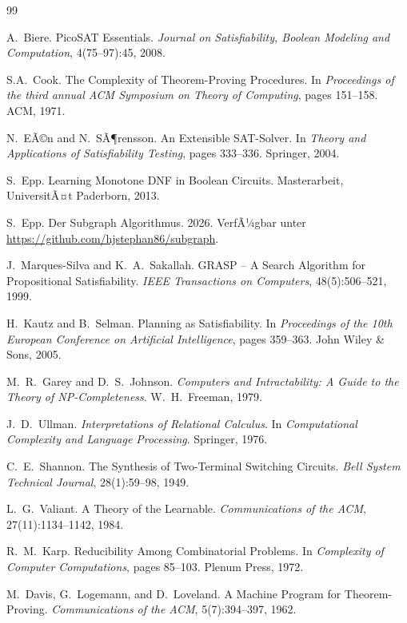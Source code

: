﻿\documentclass[a4paper,12pt]{article}
\theoremstyle{definition}
\begin{document}
\begin{thebibliography}{99}

A.\ Biere. PicoSAT Essentials. \textit{Journal on Satisfiability, Boolean Modeling and Computation}, 4(75--97):45, 2008.

S.A.\ Cook. The Complexity of Theorem-Proving Procedures. In \textit{Proceedings of the third annual ACM Symposium on Theory of Computing}, pages 151--158. ACM, 1971.

N.\ EÃ©n and N.\ SÃ¶rensson. An Extensible SAT-Solver. In \textit{Theory and Applications of Satisfiability Testing}, pages 333--336. Springer, 2004.

S.\ Epp. Learning Monotone DNF in Boolean Circuits. Masterarbeit, UniversitÃ¤t Paderborn, 2013.

S.\ Epp. Der Subgraph Algorithmus. 2026. VerfÃ¼gbar unter \url{https://github.com/hjstephan86/subgraph}.

J.\ Marques-Silva and K.\ A.\ Sakallah. GRASP -- A Search Algorithm for Propositional Satisfiability. \textit{IEEE Transactions on Computers}, 48(5):506--521, 1999.

H.\ Kautz and B.\ Selman. Planning as Satisfiability. In \textit{Proceedings of the 10th European Conference on Artificial Intelligence}, pages 359--363. John Wiley \& Sons, 2005.

M.\ R.\ Garey and D.\ S.\ Johnson. \textit{Computers and Intractability: A Guide to the Theory of NP-Completeness}. W.\ H.\ Freeman, 1979.

J.\ D.\ Ullman. \textit{Interpretations of Relational Calculus}. In \textit{Computational Complexity and Language Processing}. Springer, 1976.

C.\ E.\ Shannon. The Synthesis of Two-Terminal Switching Circuits. \textit{Bell System Technical Journal}, 28(1):59--98, 1949.

L.\ G.\ Valiant. A Theory of the Learnable. \textit{Communications of the ACM}, 27(11):1134--1142, 1984.

R.\ M.\ Karp. Reducibility Among Combinatorial Problems. In \textit{Complexity of Computer Computations}, pages 85--103. Plenum Press, 1972.

M.\ Davis, G.\ Logemann, and D.\ Loveland. A Machine Program for Theorem-Proving. \textit{Communications of the ACM}, 5(7):394--397, 1962.


\end{thebibliography}
\end{document}

